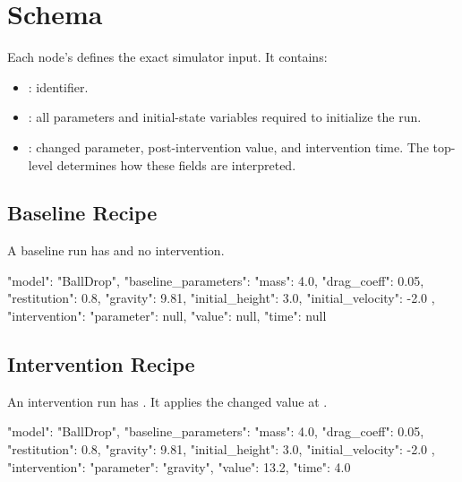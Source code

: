 \documentclass[11pt]{article}
\begin{document}
\section*{\texorpdfstring{}{recipe} Schema}

Each node's  defines the exact simulator input.
It contains:

\begin{itemize}
\item {}: \termSimulator identifier.
\item {}: all parameters and initial-state variables required to initialize the run.
\item {}: changed parameter, post-intervention value, and intervention time. The top-level  determines how these fields are interpreted.
\end{itemize}

\subsection*{Baseline Recipe}\label{sec:candidate-generation-baseline-recipe}

A baseline run has  and no intervention.

\begin{DocCode}
{
  "model": "BallDrop",
  "baseline_parameters": {
    "mass": 4.0,
    "drag_coeff": 0.05,
    "restitution": 0.8,
    "gravity": 9.81,
    "initial_height": 3.0,
    "initial_velocity": -2.0
  },
  "intervention": {
    "parameter": null,
    "value": null,
    "time": null
  }
}
\end{DocCode}

\subsection*{Intervention Recipe}

An intervention run has .
It applies the changed value at .

\begin{DocCode}
{
  "model": "BallDrop",
  "baseline_parameters": {
    "mass": 4.0,
    "drag_coeff": 0.05,
    "restitution": 0.8,
    "gravity": 9.81,
    "initial_height": 3.0,
    "initial_velocity": -2.0
  },
  "intervention": {
    "parameter": "gravity",
    "value": 13.2,
    "time": 4.0
  }
}
\end{DocCode}
\end{document}

